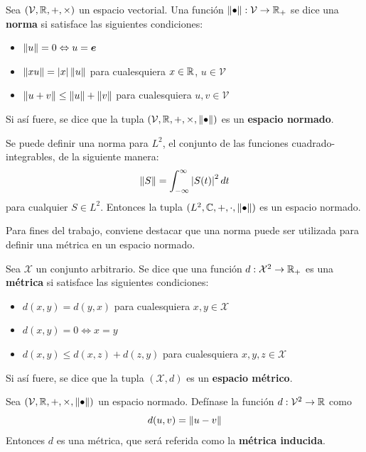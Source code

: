 \begin{definicion}
Sea $(\mathcal{V},\mathbb{R},+,\times)$ un espacio vectorial. Una función $\left\Vert \bullet \right\Vert: \mathcal{V}\rightarrow\mathbb{R}_+$ se dice una \textbf{norma} si satisface las siguientes condiciones:
\begin{itemize}
\item $\left\Vert u \right\Vert = 0 \Leftrightarrow u = \boldsymbol{e}$
\item $\left\Vert x u \right\Vert = \left| x \right| \left\Vert u \right\Vert$ para cualesquiera $x \in \mathbb{R}$, $u \in \mathcal{V}$
\item $\left\Vert u+v \right\Vert \leq \left\Vert u \right\Vert + \left\Vert v \right\Vert$ para cualesquiera $u, v \in \mathcal{V}$
\end{itemize}
Si así fuere, se dice que la tupla $(\mathcal{V},\mathbb{R},+,\times, \left\Vert \bullet \right\Vert)$ es un \textbf{espacio normado}.
\end{definicion}

\begin{ejemplo}
Se puede definir una norma para $L^{2}$, el conjunto de las funciones cuadrado-integrables, de la siguiente manera:
\begin{equation}
\left\Vert S \right\Vert = \int_{-\infty}^{\infty} \left| S(t) \right|^{2} dt
\end{equation} 
para cualquier $S \in L^{2}$. Entonces la tupla $(L^{2},\mathbb{C},+,\cdot,\left\Vert \bullet \right\Vert)$ es un espacio normado.
\label{ejemplo:norma_L2}
\end{ejemplo}

Para fines del trabajo, conviene destacar que una norma puede ser utilizada para definir una métrica en un espacio normado.

\begin{definicion}
Sea $\mathcal{X}$ un conjunto arbitrario. Se dice que una función $d: \mathcal{X}^{2}\rightarrow \mathbb{R}_+$ es una \textbf{métrica} si satisface las siguientes condiciones:
\begin{itemize}
\item $d(x,y) = d(y,x)$ para cualesquiera $x,y \in \mathcal{X}$
\item $d(x,y)=0 \Leftrightarrow x=y$
\item $d(x,y) \leq d(x,z) + d(z,y)$ para cualesquiera $x,y,z \in \mathcal{X}$
\end{itemize}
Si así fuere, se dice que la tupla $(\mathcal{X},d)$ es un \textbf{espacio métrico}.
\end{definicion}

\begin{proposicion}
Sea $(\mathcal{V},\mathbb{R},+,\times, \left\Vert \bullet \right\Vert)$ un espacio normado. Defínase la función $d: \mathcal{V}^{2} \rightarrow \mathbb{R}$ como
\begin{equation}
d(u,v) = \left\Vert u-v \right\Vert
\end{equation}
Entonces $d$ es una métrica, que será referida como la \textbf{métrica inducida}.
\end{proposicion}

